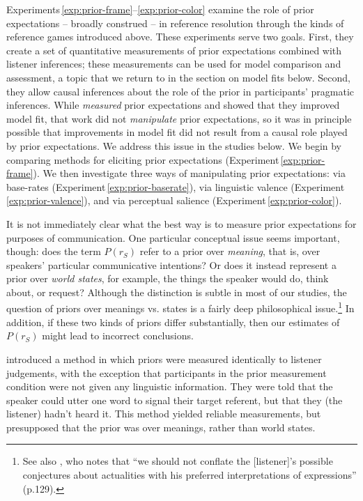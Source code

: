 \documentclass[man,noapacite]{apa2}
\newcounter{Experiment}
\newcommand{\exptref}[1]{Experiment\,\ref{#1}}
\newcommand{\exptrefrange}[2]{Experiments\,\ref{#1}--\ref{#2}}
\begin{document}
\exptrefrange{exp:prior-frame}{exp:prior-color} examine the role of prior expectations -- broadly construed -- in reference resolution through the kinds of reference games introduced above. These experiments serve two goals. First, they create a set of quantitative measurements of prior expectations combined with listener inferences; these measurements can be used for model comparison and assessment, a topic that we return to in the section on model fits below. Second, they allow causal inferences about the role of the prior in participants' pragmatic inferences. While  \emph{measured} prior expectations and showed that they improved model fit, that work did not \emph{manipulate} prior expectations, so it was in principle possible that improvements in model fit did not result from a causal role played by prior expectations. We address this issue in the studies below. We begin by comparing methods for eliciting prior expectations (\exptref{exp:prior-frame}). We then investigate three ways of manipulating prior expectations: via base-rates (\exptref{exp:prior-baserate}), via linguistic valence (\exptref{exp:prior-valence}), and via perceptual salience (\exptref{exp:prior-color}).

It is not immediately clear what the best way is to measure prior expectations for purposes of communication. One particular conceptual issue seems important, though: does the term $P(r_S)$ refer to a prior over \emph{meaning}, that is, over speakers' particular communicative intentions? Or does it instead represent a prior over \emph{world states}, for example, the things the speaker would do, think about, or request? Although the distinction is subtle in most of our studies, the question of priors over meanings vs. states is a fairly deep philosophical issue.\footnote{See also , who notes that ``we should not conflate the [listener]'s possible conjectures about actualities with his preferred interpretations of expressions'' (p.129).}  In addition, if these two kinds of priors differ substantially, then our estimates of $P(r_S)$ might lead to incorrect conclusions.

 introduced a method in which priors were measured identically to listener judgements, with the exception that participants in the prior measurement condition were not given any linguistic information. They were told that the speaker could utter one word to signal their target referent, but that they (the listener) hadn't heard it. This method yielded reliable measurements, but presupposed that the prior was over meanings, rather than world states.
\end{document}
